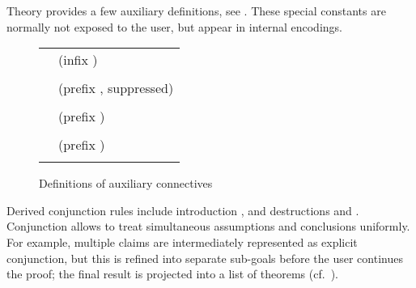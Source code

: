 \begin{isabellebody}
\begin{isamarkuptext}
\begin{description}
  \end{description}%
\end{isamarkuptext}%
\isamarkuptrue%
%
\endisatagmlref
{\isafoldmlref}%
%
\isadelimmlref
%
\endisadelimmlref
%
\isamarkuptrue%
%
\begin{isamarkuptext}%
Theory  provides a few auxiliary definitions, see
  .  These special constants are normally not
  exposed to the user, but appear in internal encodings.

  \begin{figure}[htb]
  \begin{center}
  \begin{tabular}{ll}
  \isa{conjunction\ {\isacharcolon}{\isacharcolon}\ prop\ {\isasymRightarrow}\ prop\ {\isasymRightarrow}\ prop} & (infix \isa{{\isacharampersand}}) \\
  \isa{{\isasymturnstile}\ A\ {\isacharampersand}\ B\ {\isasymequiv}\ {\isacharparenleft}{\isasymAnd}C{\isachardot}\ {\isacharparenleft}A\ {\isasymLongrightarrow}\ B\ {\isasymLongrightarrow}\ C{\isacharparenright}\ {\isasymLongrightarrow}\ C{\isacharparenright}} \\[1ex]
  \isa{prop\ {\isacharcolon}{\isacharcolon}\ prop\ {\isasymRightarrow}\ prop} & (prefix \isa{{\isacharhash}}, suppressed) \\
  \isa{{\isacharhash}A\ {\isasymequiv}\ A} \\[1ex]
  \isa{term\ {\isacharcolon}{\isacharcolon}\ {\isasymalpha}\ {\isasymRightarrow}\ prop} & (prefix \isa{TERM}) \\
  \isa{term\ x\ {\isasymequiv}\ {\isacharparenleft}{\isasymAnd}A{\isachardot}\ A\ {\isasymLongrightarrow}\ A{\isacharparenright}} \\[1ex]
  \isa{TYPE\ {\isacharcolon}{\isacharcolon}\ {\isasymalpha}\ itself} & (prefix \isa{TYPE}) \\
  \isa{{\isacharparenleft}unspecified{\isacharparenright}} \\
  \end{tabular}
  \caption{Definitions of auxiliary connectives}\label{fig:pure-aux}
  \end{center}
  \end{figure}

  Derived conjunction rules include introduction , and destructions  and .
  Conjunction allows to treat simultaneous assumptions and conclusions
  uniformly.  For example, multiple claims are intermediately
  represented as explicit conjunction, but this is refined into
  separate sub-goals before the user continues the proof; the final
  result is projected into a list of theorems (cf.\
  ).


\end{isamarkuptext}
\end{isabellebody}
